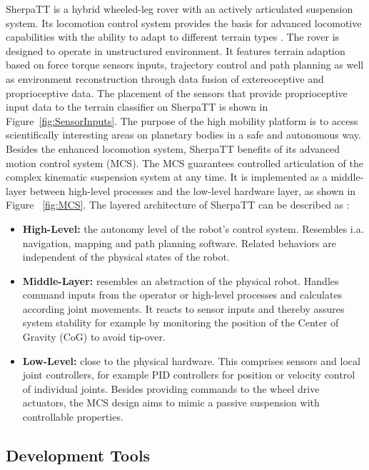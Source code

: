 SherpaTT is a hybrid wheeled-leg rover with an actively articulated suspension system. Its locomotion control system provides the basis for advanced locomotive capabilities with the ability to adapt to different terrain types \citep{cordes2018}. The rover is designed to operate in unstructured environment. It features terrain adaption based on force torque sensors inputs, trajectory control and path planning as well as environment reconstruction through data fusion of extereoceptive and proprioceptive data. The placement of the sensors that provide proprioceptive input data to the terrain classifier on SherpaTT is shown in Figure~\ref{fig:SensorInputs}. The purpose of the high mobility platform is to access scientifically interesting areas on planetary bodies in a safe and autonomous way. Besides the enhanced locomotion system, SherpaTT benefits of its advanced motion control system (MCS). The MCS guarantees controlled articulation of the complex kinematic suspension system at any time. It is implemented as a middle-layer between high-level processes and the low-level hardware layer, as shown in Figure ~\ref{fig:MCS}. The layered architecture of SherpaTT can be described as \citep{cordes2018}:

\begin{itemize}
    \item \textbf{High-Level:} the autonomy level of the robot’s control system. Resembles i.a. navigation, mapping and path planning software. Related behaviors are independent of the physical states of the robot.
    \item \textbf{Middle-Layer:} resembles an abstraction of the physical robot. Handles command inputs from the operator or high-level processes and calculates according joint movements. It reacts to sensor inputs and thereby assures system stability for example by monitoring the position of the Center of Gravity (CoG) to avoid tip-over.
    \item \textbf{Low-Level:} close to the physical hardware. This comprises sensors and local joint controllers, for example PID controllers for position or velocity control of individual joints. Besides providing commands to the wheel drive actuators, the MCS design aims to mimic a passive suspension with controllable properties.
\end{itemize}

\subsection{Development Tools}

